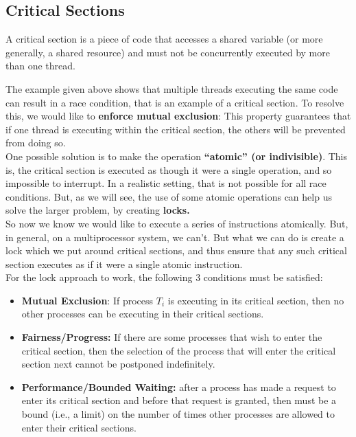 \documentclass[a4paper, 10pt]{article}
\begin{document}
\subsection{Critical Sections}
\begin{definitionbox}{}{}
    A critical section is a piece of code that accesses a shared variable (or more generally, a shared resource) and must not be concurrently executed by more than one thread.
\end{definitionbox}
\noindent The example given above  shows that multiple threads executing the same code can result in a race condition, that is an example of a critical section. To resolve this, we would like to \textbf{enforce mutual exclusion}: This property guarantees that if one thread is executing within the critical section, the others will be prevented from doing so. \\[2ex]
One possible solution is to make the operation \textbf{“atomic” (or indivisible)}. This is, the critical section is executed as though it were a single operation, and so impossible to interrupt. In a realistic setting, that is not possible for all race conditions. But, as we will see, the use of some atomic operations can help us solve the larger problem, by creating \textbf{locks.} \\[2ex]
So now we know we would like to execute a series of instructions atomically. But, in general, on a multiprocessor system, we can't. But what we can do is create a lock which we put around critical sections, and thus ensure that any such critical section executes as if it were a single atomic instruction.\\[2ex]
For the lock approach to work, the following 3 conditions must be
satisfied:
\begin{itemize}
    \item \textbf{Mutual Exclusion}: If process $T_i$ is executing in its critical section, then no other processes can be executing in their critical sections.
    \item \textbf{Fairness/Progress:} If there are some processes that wish to enter the critical section, then the selection of the process that will enter the critical section next cannot be postponed indefinitely.
    \item \textbf{Performance/Bounded Waiting: }after a process has made a request
          to enter its critical section and before that request is granted, then
          must be a bound (i.e., a limit) on the number of times other
          processes are allowed to enter their critical sections.
\end{itemize}
\end{document}
